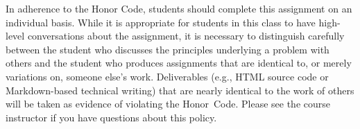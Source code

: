 \documentclass[11pt]{article}
\begin{document}
In adherence to the Honor Code, students should complete this assignment on an individual basis. While it is appropriate
for students in this class to have high-level conversations about the assignment, it is necessary to distinguish
carefully between the student who discusses the principles underlying a problem with others and the student who produces
assignments that are identical to, or merely variations on, someone else's work. Deliverables (e.g., HTML source code or
Markdown-based technical writing) that are nearly identical to the work of others will be taken as evidence of violating
the \mbox{Honor Code}. Please see the course instructor if you have questions about this policy.
\end{document}
